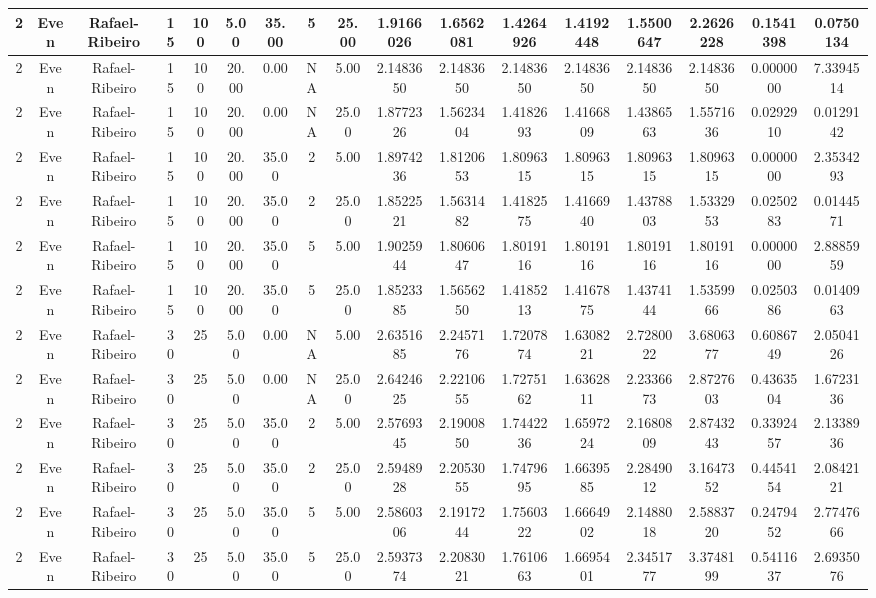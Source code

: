 \documentclass[a4paper]{article}
\begin{document}
\begin{center}
\begin{tabular}{ | c | c | c | c | c | c | c | c | c | c | c | c | c | c | c | c | c | }
		\hline
		2	&	Even	&	Rafael-Ribeiro	&	15	&	100	&	5.00	&	35.00	&	5	&	25.00	&	1.9166026	&	1.6562081	&	1.4264926	&	1.4192448	&	1.5500647	&	2.2626228	&	0.1541398	&	0.0750134 \\
		\hline
		2	&	Even	&	Rafael-Ribeiro	&	15	&	100	&	20.00	&	0.00	&	NA	&	5.00	&	2.1483650	&	2.1483650	&	2.1483650	&	2.1483650	&	2.1483650	&	2.1483650	&	0.0000000	&	7.3394514 \\
		\hline
		2	&	Even	&	Rafael-Ribeiro	&	15	&	100	&	20.00	&	0.00	&	NA	&	25.00	&	1.8772326	&	1.5623404	&	1.4182693	&	1.4166809	&	1.4386563	&	1.5571636	&	0.0292910	&	0.0129142 \\
		\hline
		2	&	Even	&	Rafael-Ribeiro	&	15	&	100	&	20.00	&	35.00	&	2	&	5.00	&	1.8974236	&	1.8120653	&	1.8096315	&	1.8096315	&	1.8096315	&	1.8096315	&	0.0000000	&	2.3534293 \\
		\hline
		2	&	Even	&	Rafael-Ribeiro	&	15	&	100	&	20.00	&	35.00	&	2	&	25.00	&	1.8522521	&	1.5631482	&	1.4182575	&	1.4166940	&	1.4378803	&	1.5332953	&	0.0250283	&	0.0144571 \\
		\hline
		2	&	Even	&	Rafael-Ribeiro	&	15	&	100	&	20.00	&	35.00	&	5	&	5.00	&	1.9025944	&	1.8060647	&	1.8019116	&	1.8019116	&	1.8019116	&	1.8019116	&	0.0000000	&	2.8885959 \\
		\hline
		2	&	Even	&	Rafael-Ribeiro	&	15	&	100	&	20.00	&	35.00	&	5	&	25.00	&	1.8523385	&	1.5656250	&	1.4185213	&	1.4167875	&	1.4374144	&	1.5359966	&	0.0250386	&	0.0140963 \\
		\hline
		2	&	Even	&	Rafael-Ribeiro	&	30	&	25	&	5.00	&	0.00	&	NA	&	5.00	&	2.6351685	&	2.2457176	&	1.7207874	&	1.6308221	&	2.7280022	&	3.6806377	&	0.6086749	&	2.0504126 \\
		\hline
		2	&	Even	&	Rafael-Ribeiro	&	30	&	25	&	5.00	&	0.00	&	NA	&	25.00	&	2.6424625	&	2.2210655	&	1.7275162	&	1.6362811	&	2.2336673	&	2.8727603	&	0.4363504	&	1.6723136 \\
		\hline
		2	&	Even	&	Rafael-Ribeiro	&	30	&	25	&	5.00	&	35.00	&	2	&	5.00	&	2.5769345	&	2.1900850	&	1.7442236	&	1.6597224	&	2.1680809	&	2.8743243	&	0.3392457	&	2.1338936 \\
		\hline
		2	&	Even	&	Rafael-Ribeiro	&	30	&	25	&	5.00	&	35.00	&	2	&	25.00	&	2.5948928	&	2.2053055	&	1.7479695	&	1.6639585	&	2.2849012	&	3.1647352	&	0.4454154	&	2.0842121 \\
		\hline
		2	&	Even	&	Rafael-Ribeiro	&	30	&	25	&	5.00	&	35.00	&	5	&	5.00	&	2.5860306	&	2.1917244	&	1.7560322	&	1.6664902	&	2.1488018	&	2.5883720	&	0.2479452	&	2.7747666 \\
		\hline
		2	&	Even	&	Rafael-Ribeiro	&	30	&	25	&	5.00	&	35.00	&	5	&	25.00	&	2.5937374	&	2.2083021	&	1.7610663	&	1.6695401	&	2.3451777	&	3.3748199	&	0.5411637	&	2.6935076 \\

\end{tabular}
\end{center}
\end{document}
